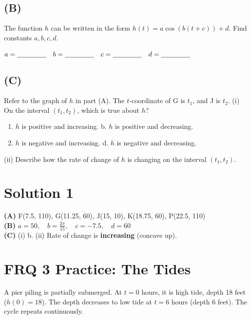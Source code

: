 \documentclass[12pt]{article}
\begin{document}
\subsection*{(B)}
The function $h$ can be written in the form $h(t) = a \cos(b(t+c)) + d$. Find constants $a, b, c, d$.

\vspace{0.5em}
$a = \underline{\hspace{1.5cm}} \quad b = \underline{\hspace{1.5cm}} \quad c = \underline{\hspace{1.5cm}} \quad d = \underline{\hspace{1.5cm}}$

\subsection*{(C)}
Refer to the graph of $h$ in part (A). The $t$-coordinate of G is $t_1$, and J is $t_2$.
(i) On the interval $(t_1, t_2)$, which is true about $h$?
\begin{enumerate}[label=\alph*.]
    \item $h$ is positive and increasing. \hfill b. $h$ is positive and decreasing.
    \item $h$ is negative and increasing. \hfill d. $h$ is negative and decreasing.
\end{enumerate}
(ii) Describe how the rate of change of $h$ is changing on the interval $(t_1, t_2)$.
\vspace{1.5cm}

\newpage
\section*{Solution 1}
\textbf{(A)} F(7.5, 110), G(11.25, 60), J(15, 10), K(18.75, 60), P(22.5, 110) \\
\textbf{(B)} $a = 50, \quad b = \frac{2\pi}{15}, \quad c = -7.5, \quad d = 60$ \\
\textbf{(C)} (i) b. (ii) Rate of change is \textbf{increasing} (concave up).

\newpage

\section*{FRQ 3 Practice: The Tides}
A pier piling is partially submerged. At $t=0$ hours, it is high tide, depth 18 feet ($h(0)=18$). The depth decreases to low tide at $t=6$ hours (depth 6 feet). The cycle repeats continuously.
\end{document}
